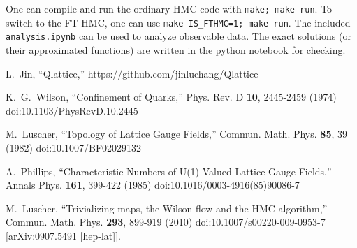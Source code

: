 \documentclass[12pt]{article}
\begin{document}
One can compile and run the ordinary HMC code with {\tt make; make run}.
To switch to the FT-HMC, one can use {\tt make IS\_FTHMC=1; make run}.
The included {\tt analysis.ipynb} can be used to analyze observable data.
The exact solutions (or their approximated functions) are written in the python notebook for checking.







\normalbaselineskip

\begin{thebibliography}{99}
  \setlength{\itemsep}{-2pt}

  L.~Jin,
  ``Qlattice,''
  https://github.com/jinluchang/Qlattice

K.~G.~Wilson,
``Confinement of Quarks,''
Phys. Rev. D \textbf{10}, 2445-2459 (1974)
doi:10.1103/PhysRevD.10.2445

M.~Luscher,
``Topology of Lattice Gauge Fields,''
Commun. Math. Phys. \textbf{85}, 39 (1982)
doi:10.1007/BF02029132

A.~Phillips,
``Characteristic Numbers of U(1) Valued Lattice Gauge Fields,''
Annals Phys. \textbf{161}, 399-422 (1985)
doi:10.1016/0003-4916(85)90086-7

M.~Luscher,
``Trivializing maps, the Wilson flow and the HMC algorithm,''
Commun. Math. Phys. \textbf{293}, 899-919 (2010)
doi:10.1007/s00220-009-0953-7
[arXiv:0907.5491 [hep-lat]].


\end{thebibliography}
\end{document}
